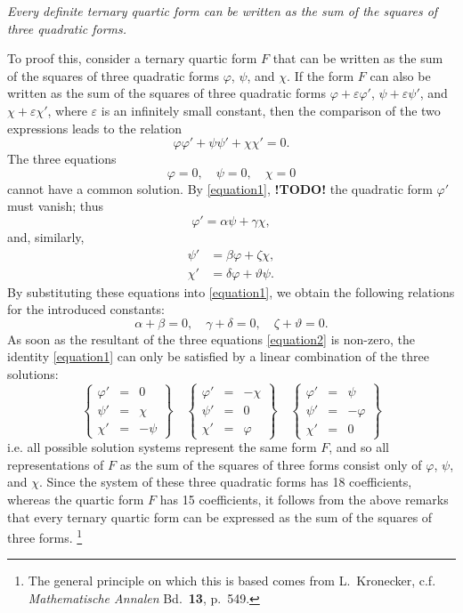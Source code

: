 \documentclass{article}
\theoremstyle{plain}
\theoremstyle{definition}
\newcommand{\todo}{\textbf{ !TODO! }}
\newcommand{\oldpage}[1]{\marginpar{\footnotesize$\Big\vert$ \textit{p.~#1}}}
\begin{document}
\emph{Every definite ternary quartic form can be written as the sum of the squares of three quadratic forms.}

To proof this, consider a ternary quartic form $F$ that can be written as the sum of the squares of three quadratic forms $\varphi$, $\psi$, and $\chi$.
If the form $F$ can also be written as the sum of the squares of three quadratic forms $\varphi+\varepsilon\varphi'$, $\psi+\varepsilon\psi'$, and $\chi+\varepsilon\chi'$, where $\varepsilon$ is an infinitely small constant, then the comparison of the two expressions leads to the relation
\[
\label{equation1}
  \varphi\varphi' + \psi\psi' + \chi\chi' = 0.
  \tag{1}
\]
The three equations
\[
\label{equation2}
  \varphi=0,
  \quad\psi=0,
  \quad\chi=0
  \tag{2}
\]
cannot have a common solution.
By \cref{equation1}, \todo
\oldpage{343}
the quadratic form $\varphi'$ must vanish;
thus
\[
  \varphi' = \alpha\psi+\gamma\chi,
\]
and, similarly,
\begin{align*}
  \psi' &= \beta\varphi+\zeta\chi,
\\\chi' &= \delta\varphi+\vartheta\psi.
\end{align*}
By substituting these equations into \cref{equation1}, we obtain the following relations for the introduced constants:
\[
  \alpha+\beta = 0,
  \quad\gamma+\delta = 0,
  \quad\zeta+\vartheta = 0.
\]
As soon as the resultant of the three equations \cref{equation2} is non-zero, the identity \cref{equation1} can only be satisfied by a linear combination of the three solutions:
\[
  \left\{
    \begin{array}{rcr}
      \varphi' &= &0
    \\\psi' &= &\chi
    \\\chi' &= &-\psi
    \end{array}
  \right\}
  \quad
  \left\{
    \begin{array}{rcr}
      \varphi' &= &-\chi
    \\\psi' &= &0
    \\\chi' &= &\varphi
    \end{array}
  \right\}
  \quad
  \left\{
    \begin{array}{rcr}
      \varphi' &= &\psi
    \\\psi' &= &-\varphi
    \\\chi' &= &0
    \end{array}
  \right\}
\]
i.e. all possible solution systems represent the same form $F$, and so all representations of $F$ as the sum of the squares of three forms consist only of $\varphi$, $\psi$, and $\chi$.
Since the system of these three quadratic forms has 18 coefficients, whereas the quartic form $F$ has 15 coefficients, it follows from the above remarks that every ternary quartic form can be expressed as the sum of the squares of three forms.
\footnote{The general principle on which this is based comes from L.~Kronecker, c.f. \emph{Mathematische Annalen} Bd.~\textbf{13}, p.~549.}



\nocite{*}

\end{document}
